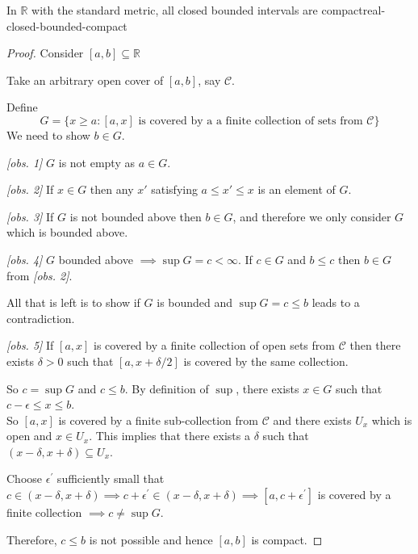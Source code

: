 \documentclass{article}
\numberwithin{equation}{section}
\numberwithin{figure}{section}
\begin{document}
\begin{theorem}{In \texorpdfstring{$\mathbb{R}$}{the real space} with the standard metric, all closed bounded intervals are compact}{real-closed-bounded-compact}
\begin{proof}
Consider $[a,b] \subseteq \mathbb{R}$

        Take an arbitrary open cover of $[a,b]$, say $\mathcal{C}$.

        Define
        \begin{equation}
            G = \{x\geq a : [a,x] \text{ is covered by a a finite collection of sets from }\mathcal{C}\}
        \end{equation}
        We need to show $b \in G$.

        \emph{[obs. 1]} $G$ is not empty as $a \in G$.

        \emph{[obs. 2]} If $x \in G$ then any $x'$ satisfying $a \leq x' \leq x$ is an element of $G$.

        \emph{[obs. 3]} If $G$ is not bounded above then $b \in G$, and therefore we only consider $G$ which is bounded above.

        \emph{[obs. 4]} $G$ bounded above $\implies \sup{G}=c<\infty$. If $c \in G$ and $b \leq c$ then $b \in G$ from \emph{[obs. 2]}.

        All that is left is to show if $G$ is bounded and $\sup G = c \leq b$ leads to a contradiction.

        \emph{[obs. 5]} If $[a,x]$ is covered by a finite collection of open sets from $\mathcal{C}$ then there exists $\delta>0$ such that $[a, x+\delta/2]$ is covered by the same collection.

        So $c = \sup G$ and $c \leq b$. By definition of $\sup$, there exists $x \in G$ such that $c-\epsilon \leq x \leq b$.\\
        So $[a,x]$ is covered by a finite sub-collection from $\mathcal{C}$ and there exists $U_x$ which is open and $x \in U_x$. This implies that there exists a $\delta$ such that $(x-\delta,x+\delta)\subseteq U_x$.

        Choose $\epsilon^\prime$ sufficiently small that $c \in (x-\delta,x+\delta) \implies c+\epsilon^\prime \in (x-\delta,x+\delta) \implies [a, c+\epsilon^\prime ]$ is covered by a finite collection $\implies c \neq \sup G$.

        Therefore, $c \leq b$ is not possible and hence $[a,b]$ is compact.
    \end{proof}
\end{theorem}
\end{document}

